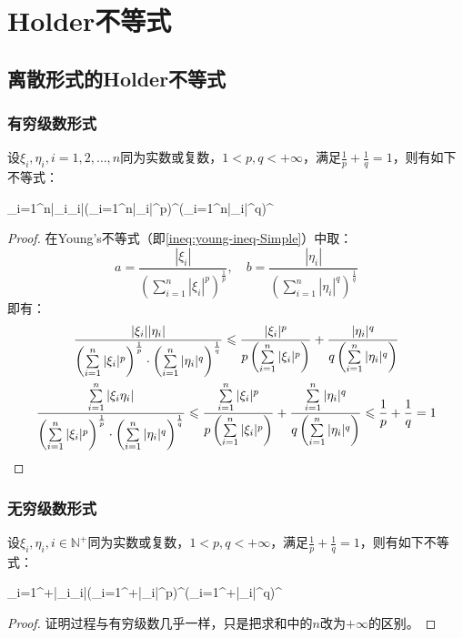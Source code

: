 \section{Holder不等式}

\subsection{离散形式的Holder不等式}
\subsubsection{有穷级数形式}
\begin{theorem}
	设$\xi_i,\eta_i,i=1,2,\dots,n$同为实数或复数，$1<p,q<+\infty$，满足$\frac{1}{p}+\frac{1}{q}=1$，则有如下不等式：
	\begin{inequality*}\label{ineq:holder-ineq-finite-series}
		\sum_{i=1}^n|\xi_i\eta_i|\leqslant\left(\sum_{i=1}^n|\xi_i|^p\right)^\cdot\left(\sum_{i=1}^n|\eta_i|^q\right)^
	\end{inequality*}
\end{theorem}
\begin{proof}
	在Young's不等式（即\cref{ineq:young-ineq-Simple}）中取：
	\begin{equation*}
		a=\frac{|\xi_i|}{\left(\sum\limits_{i=1}^n|\xi_i|^p\right)^\frac{1}{p}},\quad
		b=\frac{|\eta_i|}{\left(\sum\limits_{i=1}^n|\eta_i|^q\right)^\frac{1}{q}}
	\end{equation*}
	即有：
	\begin{gather*}
		\frac{|\xi_i||\eta_i|}{\left(\sum\limits_{i=1}^n|\xi_i|^p\right)^\frac{1}{p}\cdot\left(\sum\limits_{i=1}^n|\eta_i|^q\right)^\frac{1}{q}}
		\leqslant\frac{|\xi_i|^p}{p\left(\sum\limits_{i=1}^n|\xi_i|^p\right)}+\frac{|\eta_i|^q}{q\left(\sum\limits_{i=1}^n|\eta_i|^q\right)} \\
		\frac{\sum\limits_{i=1}^n|\xi_i\eta_i|}{\left(\sum\limits_{i=1}^n|\xi_i|^p\right)^\frac{1}{p}\cdot\left(\sum\limits_{i=1}^n|\eta_i|^q\right)^\frac{1}{q}}
		\leqslant\frac{\sum\limits_{i=1}^n|\xi_i|^p}{p\left(\sum\limits_{i=1}^n|\xi_i|^p\right)}+\frac{\sum\limits_{i=1}^n|\eta_i|^q}{q\left(\sum\limits_{i=1}^n|\eta_i|^q\right)}\leqslant\frac{1}{p}+\frac{1}{q}=1\qedhere
	\end{gather*}
\end{proof}
\subsubsection{无穷级数形式}
\begin{theorem}
	设$\xi_i,\eta_i,i\in\mathbb{N}^+$同为实数或复数，$1<p,q<+\infty$，满足$\frac{1}{p}+\frac{1}{q}=1$，则有如下不等式：
	\begin{inequality*}\label{ineq:holder-ineq-infty-series}
		\sum_{i=1}^{+\infty}|\xi_i\eta_i|\leqslant\left(\sum_{i=1}^{+\infty}|\xi_i|^p\right)^\cdot\left(\sum_{i=1}^{+\infty}|\eta_i|^q\right)^
	\end{inequality*}
\end{theorem}
\begin{proof}
	证明过程与有穷级数几乎一样，只是把求和中的$n$改为$+\infty$的区别。
\end{proof}

